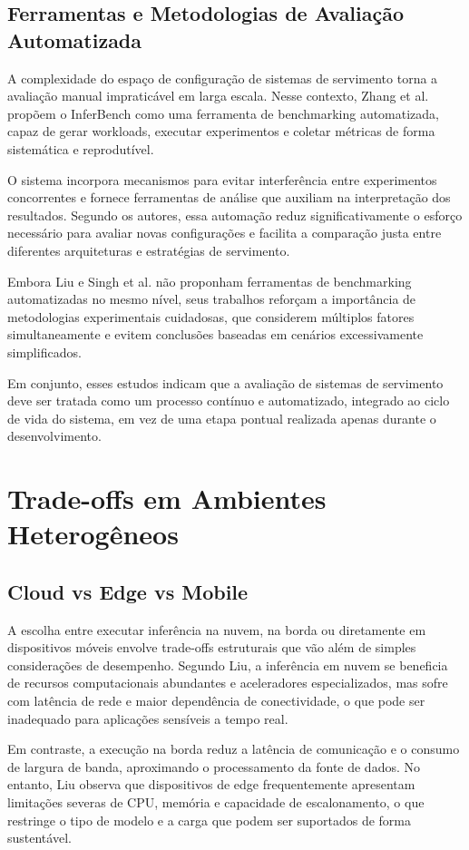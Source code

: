 \subsection{Ferramentas e Metodologias de Avaliação Automatizada}
A complexidade do espaço de configuração de sistemas de servimento torna a avaliação manual impraticável em larga escala. Nesse contexto, Zhang et al. propõem o InferBench como uma ferramenta de benchmarking automatizada, capaz de gerar workloads, executar experimentos e coletar métricas de forma sistemática e reprodutível.

O sistema incorpora mecanismos para evitar interferência entre experimentos concorrentes e fornece ferramentas de análise que auxiliam na interpretação dos resultados. Segundo os autores, essa automação reduz significativamente o esforço necessário para avaliar novas configurações e facilita a comparação justa entre diferentes arquiteturas e estratégias de servimento.

Embora Liu e Singh et al. não proponham ferramentas de benchmarking automatizadas no mesmo nível, seus trabalhos reforçam a importância de metodologias experimentais cuidadosas, que considerem múltiplos fatores simultaneamente e evitem conclusões baseadas em cenários excessivamente simplificados.

Em conjunto, esses estudos indicam que a avaliação de sistemas de servimento deve ser tratada como um processo contínuo e automatizado, integrado ao ciclo de vida do sistema, em vez de uma etapa pontual realizada apenas durante o desenvolvimento.

\section{Trade-offs em Ambientes Heterogêneos}
\subsection{Cloud vs Edge vs Mobile}
A escolha entre executar inferência na nuvem, na borda ou diretamente em dispositivos móveis envolve trade-offs estruturais que vão além de simples considerações de desempenho. Segundo Liu, a inferência em nuvem se beneficia de recursos computacionais abundantes e aceleradores especializados, mas sofre com latência de rede e maior dependência de conectividade, o que pode ser inadequado para aplicações sensíveis a tempo real.

Em contraste, a execução na borda reduz a latência de comunicação e o consumo de largura de banda, aproximando o processamento da fonte de dados. No entanto, Liu observa que dispositivos de edge frequentemente apresentam limitações severas de CPU, memória e capacidade de escalonamento, o que restringe o tipo de modelo e a carga que podem ser suportados de forma sustentável.

